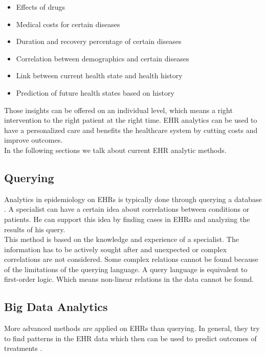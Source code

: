 \begin{itemize}

\item Effects of drugs
\item Medical costs for certain diseases
\item Duration and recovery percentage of certain diseases
\item Correlation between demographics and certain diseases
\item Link between current health state and health history
\item Prediction of future health states based on history

\end{itemize}

Those insights can be offered on an individual level, which means a right intervention to the right patient at the right time. EHR analytics can be used to have a personalized care and benefits the healthcare system by cutting costs and improve outcomes. \\

In the following sections we talk about current EHR analytic methods.


\subsection{Querying}

Analytics in epidemiology on EHRs is typically done through querying a database \cite{EHRquery:journal}. A specialist can have a certain idea about correlations between conditions or patients. He can support this idea by finding cases in EHRs and analyzing the results of his query. \\
This method is based on the knowledge and experience of a specialist. The information has to be actively sought after and unexpected or complex correlations are not considered. Some complex relations cannot be found because of the limitations of the querying language. A query language is equivalent to first-order logic. Which means non-linear relations in the data cannot be found.

\subsection{Big Data Analytics}

More advanced methods are applied on EHRs than querying. In general, they try to find patterns in the EHR data which then can be used to predict outcomes of treatments \cite{EHRbigdata:slides}. \\

